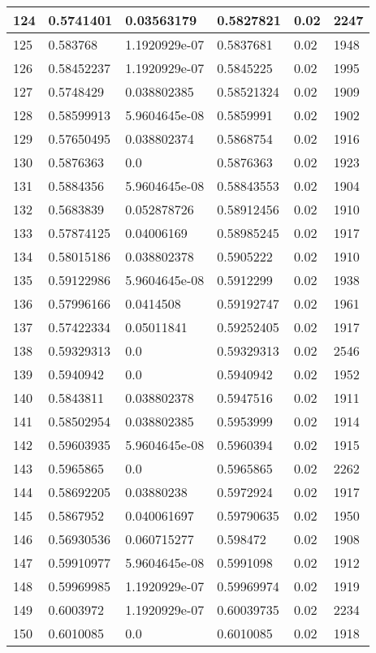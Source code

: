\begin{longtable}{|l|l|l|l|l|l|}
124 & 0.5741401 & 0.03563179 & 0.5827821 & 0.02 & 2247 \\ \hline 
125 & 0.583768 & 1.1920929e-07 & 0.5837681 & 0.02 & 1948 \\ \hline 
126 & 0.58452237 & 1.1920929e-07 & 0.5845225 & 0.02 & 1995 \\ \hline 
127 & 0.5748429 & 0.038802385 & 0.58521324 & 0.02 & 1909 \\ \hline 
128 & 0.58599913 & 5.9604645e-08 & 0.5859991 & 0.02 & 1902 \\ \hline 
129 & 0.57650495 & 0.038802374 & 0.5868754 & 0.02 & 1916 \\ \hline 
130 & 0.5876363 & 0.0 & 0.5876363 & 0.02 & 1923 \\ \hline 
131 & 0.5884356 & 5.9604645e-08 & 0.58843553 & 0.02 & 1904 \\ \hline 
132 & 0.5683839 & 0.052878726 & 0.58912456 & 0.02 & 1910 \\ \hline 
133 & 0.57874125 & 0.04006169 & 0.58985245 & 0.02 & 1917 \\ \hline 
134 & 0.58015186 & 0.038802378 & 0.5905222 & 0.02 & 1910 \\ \hline 
135 & 0.59122986 & 5.9604645e-08 & 0.5912299 & 0.02 & 1938 \\ \hline 
136 & 0.57996166 & 0.0414508 & 0.59192747 & 0.02 & 1961 \\ \hline 
137 & 0.57422334 & 0.05011841 & 0.59252405 & 0.02 & 1917 \\ \hline 
138 & 0.59329313 & 0.0 & 0.59329313 & 0.02 & 2546 \\ \hline 
139 & 0.5940942 & 0.0 & 0.5940942 & 0.02 & 1952 \\ \hline 
140 & 0.5843811 & 0.038802378 & 0.5947516 & 0.02 & 1911 \\ \hline 
141 & 0.58502954 & 0.038802385 & 0.5953999 & 0.02 & 1914 \\ \hline 
142 & 0.59603935 & 5.9604645e-08 & 0.5960394 & 0.02 & 1915 \\ \hline 
143 & 0.5965865 & 0.0 & 0.5965865 & 0.02 & 2262 \\ \hline 
144 & 0.58692205 & 0.03880238 & 0.5972924 & 0.02 & 1917 \\ \hline 
145 & 0.5867952 & 0.040061697 & 0.59790635 & 0.02 & 1950 \\ \hline 
146 & 0.56930536 & 0.060715277 & 0.598472 & 0.02 & 1908 \\ \hline 
147 & 0.59910977 & 5.9604645e-08 & 0.5991098 & 0.02 & 1912 \\ \hline 
148 & 0.59969985 & 1.1920929e-07 & 0.59969974 & 0.02 & 1919 \\ \hline 
149 & 0.6003972 & 1.1920929e-07 & 0.60039735 & 0.02 & 2234 \\ \hline 
150 & 0.6010085 & 0.0 & 0.6010085 & 0.02 & 1918 \\ \hline 
\end{longtable}